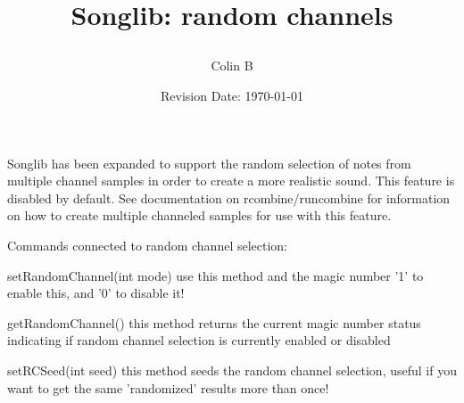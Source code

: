 \documentclass{article}
\title{Songlib: random channels\\
\date{Revision Date: \today}}
\author{Colin B}
\begin{document}
\maketitle

\W\subsubsection*{}
\W\htmlrule

Songlib has been expanded to support the random selection of notes from multiple
channel samples in order to create a more realistic sound. This feature is disabled
by default. See documentation on rcombine/runcombine for information on how to 
create multiple channeled samples for use with this feature.

Commands connected to random channel selection:

setRandomChannel(int mode)
use this method and the magic number '1' to enable this, and '0' to disable it!

getRandomChannel()
this method returns the current magic number status indicating if random channel
selection is currently enabled or disabled

setRCSeed(int seed)
this method seeds the random channel selection, useful if you want to get the same
'randomized' results more than once!
\end{document}
